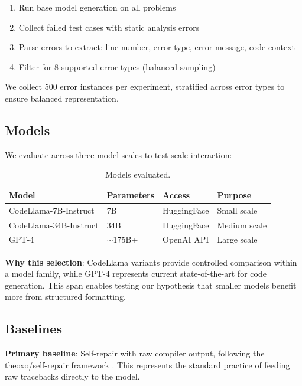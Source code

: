 \begin{enumerate}
    \item Run base model generation on all problems
    \item Collect failed test cases with static analysis errors
    \item Parse errors to extract: line number, error type, error message, code context
    \item Filter for 8 supported error types (balanced sampling)
\end{enumerate}

We collect 500 error instances per experiment, stratified across error types to ensure balanced representation.

\subsection{Models}

We evaluate across three model scales to test scale interaction:

\begin{table}[H]
\centering
\begin{tabular}{@{}llll@{}}
\toprule
\textbf{Model} & \textbf{Parameters} & \textbf{Access} & \textbf{Purpose} \\
\midrule
CodeLlama-7B-Instruct & 7B & HuggingFace & Small scale \\
CodeLlama-34B-Instruct & 34B & HuggingFace & Medium scale \\
GPT-4 & $\sim$175B+ & OpenAI API & Large scale \\
\bottomrule
\end{tabular}
\caption{Models evaluated.}
\end{table}

\textbf{Why this selection}: CodeLlama variants provide controlled comparison within a model family, while GPT-4 represents current state-of-the-art for code generation. This span enables testing our hypothesis that smaller models benefit more from structured formatting.

\subsection{Baselines}

\textbf{Primary baseline}: Self-repair with raw compiler output, following the theoxo/self-repair framework \citep{theoxo2024iclr}. This represents the standard practice of feeding raw tracebacks directly to the model.

